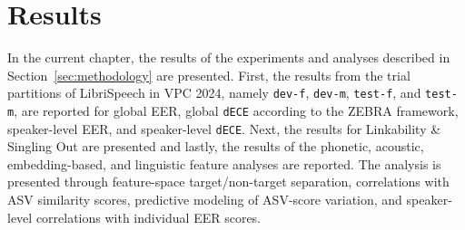 \documentclass[12pt,leqno,a4paper]{article}
\begin{document}
\section{Results}
\label{sec:results}

In the current chapter, the results of the experiments and analyses described in Section~\ref{sec:methodology} are presented. First, the results from the trial partitions of LibriSpeech in VPC 2024, namely \texttt{dev-f}, \texttt{dev-m}, \texttt{test-f}, and \texttt{test-m}, are reported for global EER, global \texttt{dECE} according to the ZEBRA framework, speaker-level EER, and speaker-level \texttt{dECE}. Next, the results for Linkability \& Singling Out are presented and lastly, the results of the phonetic, acoustic, embedding-based, and linguistic feature analyses are reported. The analysis is presented through feature-space target/non-target separation, correlations with ASV similarity scores, predictive modeling of ASV-score variation, and speaker-level correlations with individual EER scores.



\end{document}
